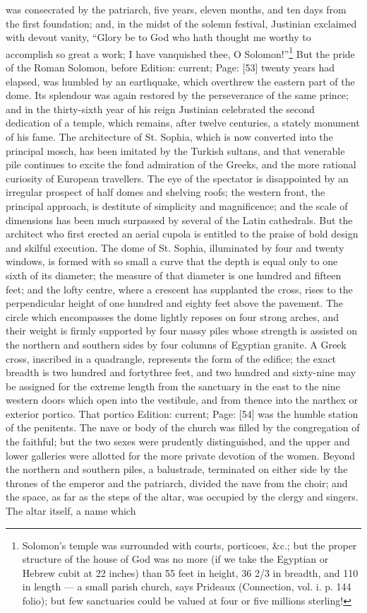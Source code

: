 was consecrated by the patriarch, five years, eleven months, and ten days from the first foundation; and, in the midst of the solemn festival, Justinian exclaimed with devout vanity, \texthebrew{“}Glory be to God who hath thought me worthy to accomplish so great a work; I have vanquished thee, O Solomon!\texthebrew{}”\footnote{Solomon\texthebrew{}’s temple was surrounded with courts, porticoes, \&c.; but the proper structure of the house of God was no more (if we take the Egyptian or Hebrew cubit at 22 inches) than 55 feet in height, 36 2/3 in breadth, and 110 in length \texthebrew{—} a small parish church, says Prideaux (Connection, vol. i. p. 144 folio); but few sanctuaries could be valued at four or five millions sterling!} But the pride of the Roman Solomon, before Edition: current; Page: [53] twenty years had elapsed, was humbled by an earthquake, which overthrew the eastern part of the dome. Its splendour was again restored by the perseverance of the same prince; and in the thirty-sixth year of his reign Justinian celebrated the second dedication of a temple, which remains, after twelve centuries, a stately monument of his fame. The architecture of St. Sophia, which is now converted into the principal mosch, has been imitated by the Turkish sultans, and that venerable pile continues to excite the fond admiration of the Greeks, and the more rational curiosity of European travellers. The eye of the spectator is disappointed by an irregular prospect of half domes and shelving roofs; the western front, the principal approach, is destitute of simplicity and magnificence; and the scale of dimensions has been much surpassed by several of the Latin cathedrals. But the architect who first erected an aerial cupola is entitled to the praise of bold design and skilful execution. The dome of St. Sophia, illuminated by four and twenty windows, is formed with so small a curve that the depth is equal only to one sixth of its diameter; the measure of that diameter is one hundred and fifteen feet; and the lofty centre, where a crescent has supplanted the cross, rises to the perpendicular height of one hundred and eighty feet above the pavement. The circle which encompasses the dome lightly reposes on four strong arches, and their weight is firmly supported by four massy piles whose strength is assisted on the northern and southern sides by four columns of Egyptian granite. A Greek cross, inscribed in a quadrangle, represents the form of the edifice; the exact breadth is two hundred and fortythree feet, and two hundred and sixty-nine may be assigned for the extreme length from the sanctuary in the east to the nine western doors which open into the vestibule, and from thence into the narthex or exterior portico. That portico Edition: current; Page: [54] was the humble station of the penitents. The nave or body of the church was filled by the congregation of the faithful; but the two sexes were prudently distinguished, and the upper and lower galleries were allotted for the more private devotion of the women. Beyond the northern and southern piles, a balustrade, terminated on either side by the thrones of the emperor and the patriarch, divided the nave from the choir; and the space, as far as the steps of the altar, was occupied by the clergy and singers. The altar itself, a name which 